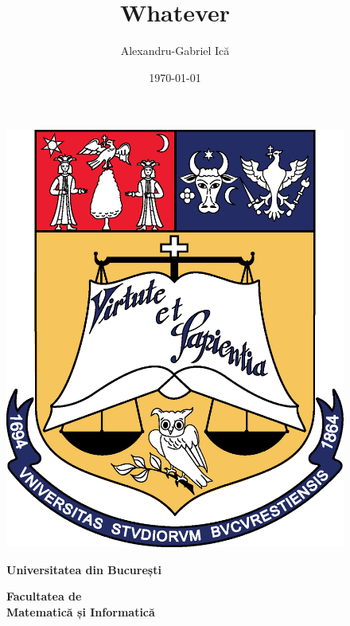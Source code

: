 \documentclass[a4paper, 12pt]{report}
\title{Whatever}
\author{Alexandru-Gabriel Ică}
\date{\today}
\begin{document}
\begin{titlepage}
    \begin{figure}[!htb]
    \centering
    \begin{minipage}{0.19\textwidth}
        \includegraphics[width=\linewidth]{img/UB_Logo.png}
    \end{minipage}
    \begin{minipage}{0.57\textwidth}
        \large
        \vspace{0.2cm}
        \begin{center}
            \textbf{Universitatea din București}
        \end{center}
        \vspace{0.3cm}
        \begin{center}
            \textbf{
                Facultatea de \\
                Matematică și Informatică
            }
        \end{center}
    \end{minipage}
    \begin{minipage}{0.21\textwidth}

\end{minipage}
\end{figure}
\end{titlepage}
\end{document}

